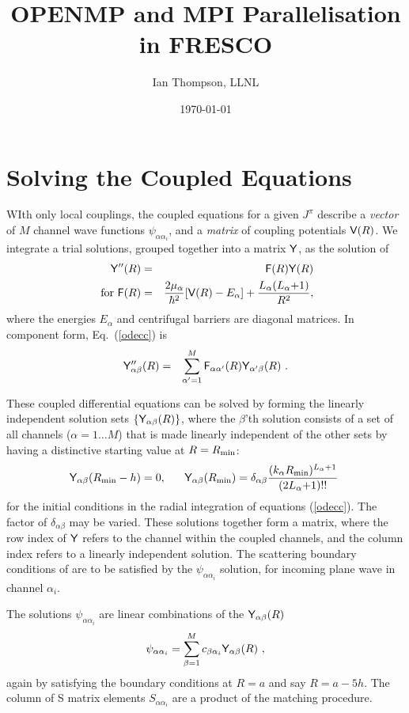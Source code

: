 \documentclass[11pt]{article}
\title{OPENMP and MPI Parallelisation in FRESCO}
\author{Ian Thompson, LLNL}
\date{\today }                                           %
\newcommand{\T}{{}}  %
\newcommand{\bea}{\begin{eqnarray}}
\newcommand{\eea}{\end{eqnarray}}
\begin{document}
\maketitle
\section{Solving the Coupled Equations}
WIth only local couplings, the coupled equations for a given $J_\T^\pi$ 
describe a {\em vector} of $M$ channel wave functions $\psi_{\alpha\alpha_i}$, and
a {\em matrix} of coupling potentials ${\sf V}(R)$. We integrate a trial
solutions, grouped together into a matrix ${\sf Y}$, as the solution of
\bea  \label{odecc}
{\sf Y}''(R) &=& {\sf F}(R) {\sf Y}(R) \\
\text{~for~}
    {\sf F}(R) &=&  \frac{2\mu_\alpha}{\hbar^2}[{\sf V}(R) - E_\alpha]
               + \frac{L_\alpha(L_\alpha{+}1)}{R^2} ,
\eea
where the energies $E_\alpha$ and centrifugal barriers are diagonal matrices. In component form, Eq.\ (\ref{odecc}) is
\bea \label{odeccc}
{\sf Y}_{\alpha \beta} ''(R) &=& \sum_{\alpha'=1}^M  {\sf F}_{\alpha \alpha'}(R) {\sf Y}_{\alpha' \beta}(R)\ .
\eea

These coupled differential equations can be solved by forming the linearly independent solution
sets $\{{\sf Y}_{\alpha\beta}(R)\}$, where the $\beta$'th solution consists of
a set of all channels ($\alpha=1 \ldots M$) that is made linearly independent of
the other sets by having a distinctive starting value at $R=R_{\rm min}$:
\begin{eqnarray} \label{rstart}
    {\sf Y}_{\alpha \beta} (R_{\rm min} - h) = 0, ~~~~~
    {\sf Y}_{\alpha \beta} (R_{\rm min}) = \delta_{\alpha\beta}
      \frac{ (k_\alpha R_{\rm min})^{L_\alpha + 1} }{(2L_\alpha {+} 1)!!} ~
\end{eqnarray}
for the initial conditions in the radial integration of equations
(\ref{odecc}). The factor of $\delta_{\alpha\beta}$ may be varied.
These solutions together form a matrix,  where the row index of ${\sf
Y}$ refers to the channel within the coupled channels, and the column index
refers to a linearly independent solution. The scattering boundary conditions of
are to be satisfied by the $\psi_{\alpha\alpha_i}$
solution, for incoming plane wave in channel $\alpha_i$.

The solutions $\psi_{\alpha\alpha_i}$ are linear combinations of the
${\sf Y}_{\alpha\beta}(R) $
\begin{eqnarray} \label{linsum}
     \psi_{\alpha\alpha_i}  = \sum _{\beta=1}^M c_{\beta\alpha_i} {\sf Y}_{\alpha \beta}(R)\ ,
\end{eqnarray}
again by satisfying the boundary conditions at $R = a$
and say $R = a - 5h. $ The column of S matrix elements  $S_{\alpha\alpha_i}$ are a product of the
matching procedure.
\end{document}
